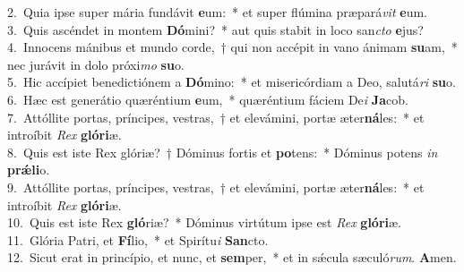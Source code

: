 {2.~}Quia ipse super mária fundávit \textbf{e}um:~* et super flúmina præpará\textit{vit} \textbf{e}um.\\
{3.~}Quis ascéndet in montem \textbf{Dó}mini?~* aut quis stabit in loco san\textit{cto} \textbf{e}jus?\\
{4.~}Innocens mánibus et mundo corde,~† qui non accépit in vano ánimam \textbf{su}am,~* nec jurávit in dolo próxi\textit{mo} \textbf{su}o.\\
{5.~}Hic accípiet benedictiónem a \textbf{Dó}mino:~* et misericórdiam a Deo, salutá\textit{ri} \textbf{su}o.\\
{6.~}Hæc est generátio quæréntium \textbf{e}um,~* quæréntium fáciem De\textit{i} \textbf{Ja}cob.\\
{7.~}Attóllite portas, príncipes, vestras,~† et elevámini, portæ æter\textbf{ná}les:~* et introíbit \textit{Rex} \textbf{gló}\textbf{ri}æ.\\
{8.~}Quis est iste Rex glóriæ?~† Dóminus fortis et \textbf{po}tens:~* Dóminus potens \textit{in} \textbf{prǽ}\textbf{li}o.\\
{9.~}Attóllite portas, príncipes, vestras,~† et elevámini, portæ æter\textbf{ná}les:~* et introíbit \textit{Rex} \textbf{gló}\textbf{ri}æ.\\
{10.~}Quis est iste Rex \textbf{gló}riæ?~* Dóminus virtútum ipse est \textit{Rex} \textbf{gló}\textbf{ri}æ.\\
{11.~}Glória Patri, et \textbf{Fí}lio,~* et Spirítu\textit{i} \textbf{San}cto.\\
{12.~}Sicut erat in princípio, et nunc, et \textbf{sem}per,~* et in sǽcula sæculó\textit{rum}. \textbf{A}men.\\
